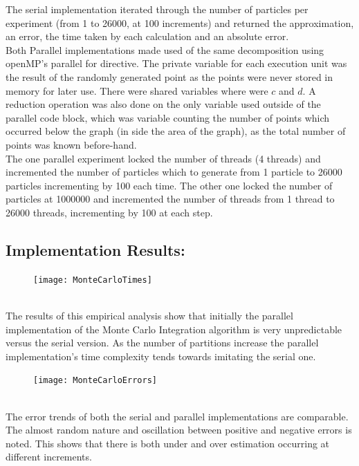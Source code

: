 \documentclass[11pt]{article}
\begin{document}
\begin{page}
\noindent The serial implementation iterated through the number of particles per experiment (from 1 to 26000, at 100 increments) and returned the approximation, an error, the time taken by each calculation and an absolute error.\\

\noindent Both Parallel implementations made used of the same decomposition using openMP's parallel for directive. The private variable for each execution unit was the result of the randomly generated point as the points were never stored in memory for later use. There were shared variables where were $c$ and $d$. A reduction operation was also done on the only variable used outside of the parallel code block, which was variable counting the number of points which occurred below the graph (in side the area of the graph), as the total number of points was known before-hand.\\

\noindent The one parallel experiment locked the number of threads (4 threads) and incremented the number of particles which to generate from 1 particle to 26000 particles incrementing by 100 each time. The other one locked the number of particles at 1000000 and incremented the number of threads from 1 thread to 26000 threads, incrementing by 100 at each step.


\subsection{Implementation Results:}
\begin{figure}[ht]
\centering
     \texttt{[image: MonteCarloTimes]}
\end{figure}\\

\noindent The results of this empirical analysis show that initially the parallel implementation of the Monte Carlo Integration algorithm is very unpredictable versus the serial version. As the number of partitions increase the parallel implementation's time complexity tends towards imitating the serial one.\\

\begin{figure}[ht]
\centering
     \texttt{[image: MonteCarloErrors]}
\end{figure}\\

\noindent The error trends of both the serial and parallel implementations are comparable. The almost random nature and oscillation between positive and negative errors is noted. This shows that there is both under and over estimation occurring at different increments.\\


\end{page}
\end{document}
